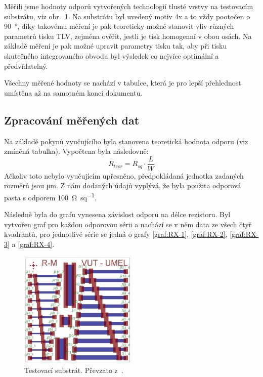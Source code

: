 Měřili jsme hodnoty odporů vytvořených technologií tlusté vrstvy na testovacím substrátu, viz obr.~\ref{fig:img-fuck-png}. Na substrátu byl uvedený motiv 4x a to vždy pootočen o \qty{90}{\degree}, díky takovému měření je pak teoreticky možné stanovit vliv různých parametrů tisku TLV, zejména ověřit, jestli je tisk homogenní v obou osách. Na základě měření je pak možné upravit parametry tisku tak, aby při tisku skutečného integrovaného obvodu byl výsledek co nejvíce optimální a předvídatelný. 

Všechny měřené hodnoty se nachází v tabulce, která je pro lepší přehlednost umístěna až na samotném konci dokumentu. 

\subsection{Zpracování měřených dat}
    Na základě pokynů vyučujícího byla stanovena teoretická hodnota odporu (viz zmíněná tabulka). Vypočtena byla následovně:
    \[
        R_{teor}  = R_{sq}\cdot \frac{L}{W} 
    \]
    Ačkoliv toto nebylo vyučujícím upřesněno, předpokládaná jednotka zadaných rozměrů jsou \unit{\micro\meter}. Z nám dodaných údajů vyplývá, že byla použita odporová pasta s odporem \qty{100}{\ohm\per sq}.

    Následně byla do grafu vynesena závislost odporu na délce rezistoru. Byl vytvořen graf pro každou odporovou sérii a nachází se v něm data ze všech čtyř kvadrantů, pro jednotlivé série se jedná o grafy \ref{graf:RX-1}, \ref{graf:RX-2}, \ref{graf:RX-3} a \ref{graf:RX-4}.

\begin{figure}[h!]
    \centering
    \includegraphics[width=0.5\textwidth]{img/fuck.png}
    \caption{Testovací substrát. Převzato z~\cite{zadani}.}
    \label{fig:img-fuck-png}
\end{figure}

